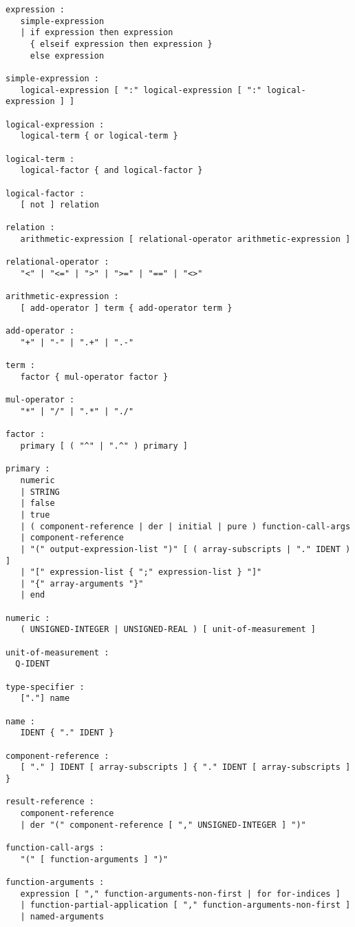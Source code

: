 \begin{lstlisting}[language=grammar]
expression :
   simple-expression
   | if expression then expression
     { elseif expression then expression }
     else expression

simple-expression :
   logical-expression [ ":" logical-expression [ ":" logical-expression ] ]

logical-expression :
   logical-term { or logical-term }

logical-term :
   logical-factor { and logical-factor }

logical-factor :
   [ not ] relation

relation :
   arithmetic-expression [ relational-operator arithmetic-expression ]

relational-operator :
   "<" | "<=" | ">" | ">=" | "==" | "<>"

arithmetic-expression :
   [ add-operator ] term { add-operator term }

add-operator :
   "+" | "-" | ".+" | ".-"

term :
   factor { mul-operator factor }

mul-operator :
   "*" | "/" | ".*" | "./"

factor :
   primary [ ( "^" | ".^" ) primary ]

primary :
   numeric
   | STRING
   | false
   | true
   | ( component-reference | der | initial | pure ) function-call-args
   | component-reference
   | "(" output-expression-list ")" [ ( array-subscripts | "." IDENT ) ]
   | "[" expression-list { ";" expression-list } "]"
   | "{" array-arguments "}"
   | end

numeric :
   ( UNSIGNED-INTEGER | UNSIGNED-REAL ) [ unit-of-measurement ]

unit-of-measurement :
  Q-IDENT

type-specifier :
   ["."] name

name :
   IDENT { "." IDENT }

component-reference :
   [ "." ] IDENT [ array-subscripts ] { "." IDENT [ array-subscripts ] }

result-reference :
   component-reference
   | der "(" component-reference [ "," UNSIGNED-INTEGER ] ")"

function-call-args :
   "(" [ function-arguments ] ")"

function-arguments :
   expression [ "," function-arguments-non-first | for for-indices ]
   | function-partial-application [ "," function-arguments-non-first ]
   | named-arguments


\end{lstlisting}
